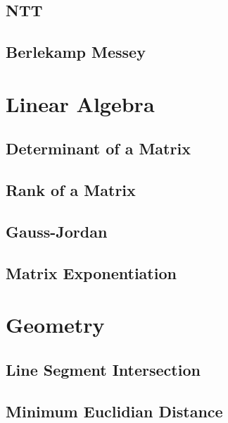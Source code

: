 \documentclass[10pt]{article}
\begin{document}
\begin{multicols*}{2}
\subsection{NTT}


\subsection{Berlekamp Messey}


\section{Linear Algebra}

\subsection{Determinant of a Matrix}


\subsection{Rank of a Matrix}



\subsection{Gauss-Jordan}



\subsection{Matrix Exponentiation}


\section{Geometry}

\subsection{Line Segment Intersection}

\subsection{Minimum Euclidian Distance}


\end{multicols*}
\end{document}
